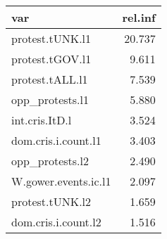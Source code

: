 \begin{tabular}{lr}
  \hline
var & rel.inf \\ 
  \hline
protest.tUNK.l1 & 20.737 \\ 
  protest.tGOV.l1 & 9.611 \\ 
  protest.tALL.l1 & 7.539 \\ 
  opp\_protests.l1 & 5.880 \\ 
  int.cris.ItD.l & 3.524 \\ 
  dom.cris.i.count.l1 & 3.403 \\ 
  opp\_protests.l2 & 2.490 \\ 
  W.gower.events.ic.l1 & 2.097 \\ 
  protest.tUNK.l2 & 1.659 \\ 
  dom.cris.i.count.l2 & 1.516 \\ 
   \hline
\end{tabular}
